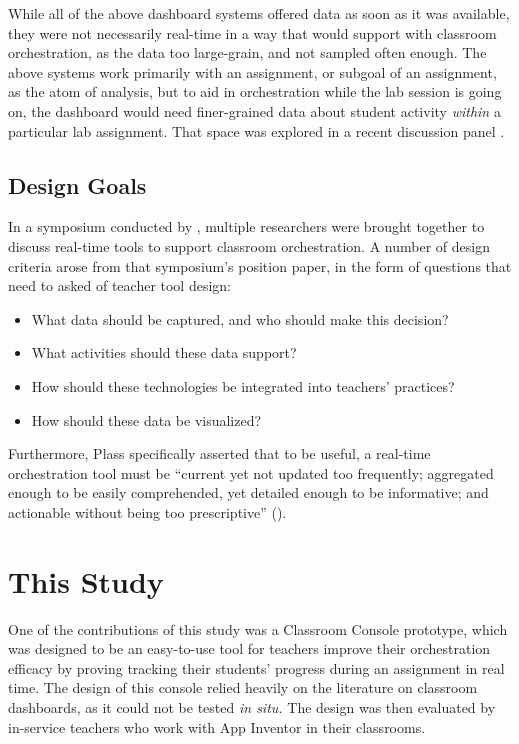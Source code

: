 While all of the above dashboard systems offered data as soon as it was available, they were not necessarily real-time in a way that would support with classroom orchestration, as the data too large-grain, and not sampled often enough. The above systems work primarily with an assignment, or subgoal of an assignment, as the atom of analysis, but to aid in orchestration while the lab session is going on, the dashboard would need finer-grained data about student activity \emph{within} a particular lab assignment. That space was explored in a recent discussion panel \citep{dillenbourgreal}.


\subsection{Design Goals}
In a symposium conducted by \cite{dillenbourgreal}, multiple researchers were brought together to discuss real-time tools to support classroom orchestration. A number of design criteria arose from that symposium's position paper, in the form of questions that need to asked of teacher tool design:
\begin{itemize}
\item What data should be captured, and who should make this decision?
\item What activities should these data support?
\item How should these technologies be integrated into teachers' practices?
\item How should these data be visualized?
\end{itemize}

Furthermore, Plass specifically asserted that to be useful, a real-time orchestration tool must be ``current yet not updated too frequently; aggregated enough to be easily comprehended, yet detailed enough to be informative; and actionable without being too prescriptive'' (\citeyear{dillenbourgreal}).


\section{This Study}
One of the contributions of this study was a Classroom Console prototype, which was designed to be an easy-to-use tool for teachers improve their orchestration efficacy by proving tracking their students' progress during an assignment in real time. The design of this console relied heavily on the literature on classroom dashboards, as it could not be tested \emph{in situ.} The design was then evaluated by in-service teachers who work with App Inventor in their classrooms. 

